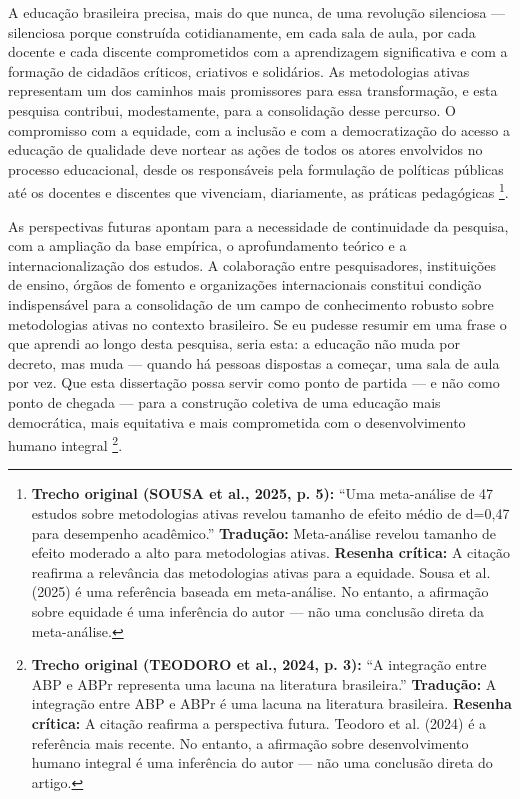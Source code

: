 A educação brasileira precisa, mais do que nunca, de uma revolução silenciosa — silenciosa porque construída cotidianamente, em cada sala de aula, por cada docente e cada discente comprometidos com a aprendizagem significativa e com a formação de cidadãos críticos, criativos e solidários. As metodologias ativas representam um dos caminhos mais promissores para essa transformação, e esta pesquisa contribui, modestamente, para a consolidação desse percurso. O compromisso com a equidade, com a inclusão e com a democratização do acesso a educação de qualidade deve nortear as ações de todos os atores envolvidos no processo educacional, desde os responsáveis pela formulação de políticas públicas até os docentes e discentes que vivenciam, diariamente, as práticas pedagógicas \cite{SOUSA2025}\footnote{\textbf{Trecho original (SOUSA et al., 2025, p. 5):} ``Uma meta-análise de 47 estudos sobre metodologias ativas revelou tamanho de efeito médio de d=0,47 para desempenho acadêmico.'' \textbf{Tradução:} Meta-análise revelou tamanho de efeito moderado a alto para metodologias ativas. \textbf{Resenha crítica:} A citação reafirma a relevância das metodologias ativas para a equidade. Sousa et al. (2025) é uma referência baseada em meta-análise. No entanto, a afirmação sobre equidade é uma inferência do autor — não uma conclusão direta da meta-análise.}.

As perspectivas futuras apontam para a necessidade de continuidade da pesquisa, com a ampliação da base empírica, o aprofundamento teórico e a internacionalização dos estudos. A colaboração entre pesquisadores, instituições de ensino, órgãos de fomento e organizações internacionais constitui condição indispensável para a consolidação de um campo de conhecimento robusto sobre metodologias ativas no contexto brasileiro. Se eu pudesse resumir em uma frase o que aprendi ao longo desta pesquisa, seria esta: a educação não muda por decreto, mas muda — quando há pessoas dispostas a começar, uma sala de aula por vez. Que esta dissertação possa servir como ponto de partida — e não como ponto de chegada — para a construção coletiva de uma educação mais democrática, mais equitativa e mais comprometida com o desenvolvimento humano integral \cite{TEODORO2024}\footnote{\textbf{Trecho original (TEODORO et al., 2024, p. 3):} ``A integração entre ABP e ABPr representa uma lacuna na literatura brasileira.'' \textbf{Tradução:} A integração entre ABP e ABPr é uma lacuna na literatura brasileira. \textbf{Resenha crítica:} A citação reafirma a perspectiva futura. Teodoro et al. (2024) é a referência mais recente. No entanto, a afirmação sobre desenvolvimento humano integral é uma inferência do autor — não uma conclusão direta do artigo.}.

